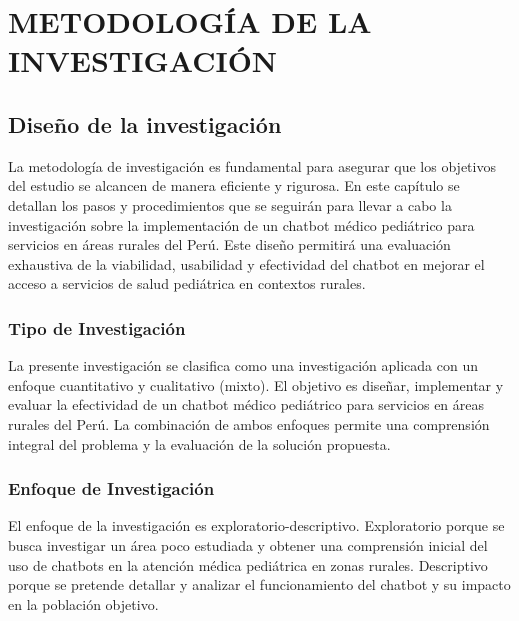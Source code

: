\chapter{METODOLOGÍA DE LA INVESTIGACIÓN}

\section{Diseño de la investigación}
La metodología de investigación es fundamental para asegurar que los objetivos del estudio se alcancen de manera eficiente y rigurosa. En este capítulo se detallan los pasos y procedimientos que se seguirán para llevar a cabo la investigación sobre la implementación de un chatbot médico pediátrico para servicios en áreas rurales del Perú. Este diseño permitirá una evaluación exhaustiva de la viabilidad, usabilidad y efectividad del chatbot en mejorar el acceso a servicios de salud pediátrica en contextos rurales.

\subsection{Tipo de Investigación}
La presente investigación se clasifica como una investigación aplicada con un enfoque cuantitativo y cualitativo (mixto). El objetivo es diseñar, implementar y evaluar la efectividad de un chatbot médico pediátrico para servicios en áreas rurales del Perú. La combinación de ambos enfoques permite una comprensión integral del problema y la evaluación de la solución propuesta.

\subsection{Enfoque de Investigación}
El enfoque de la investigación es exploratorio-descriptivo. Exploratorio porque se busca investigar un área poco estudiada y obtener una comprensión inicial del uso de chatbots en la atención médica pediátrica en zonas rurales. Descriptivo porque se pretende detallar y analizar el funcionamiento del chatbot y su impacto en la población objetivo.


